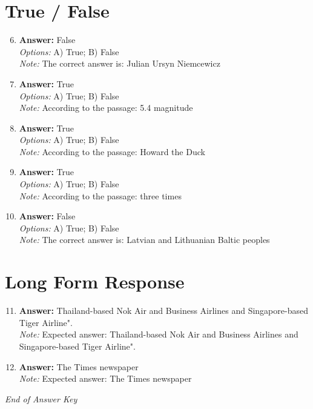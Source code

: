 \documentclass[12pt]{article}
\begin{document}
\section*{True / False}
\begin{enumerate}[label=\arabic*.]
\setcounter{enumi}{5}
\item \textbf{Answer:} False
\\ \textit{Options:} A) True; B) False
\\ \textit{Note:} The correct answer is: Julian Ursyn Niemcewicz
\item \textbf{Answer:} True
\\ \textit{Options:} A) True; B) False
\\ \textit{Note:} According to the passage: 5.4 magnitude
\item \textbf{Answer:} True
\\ \textit{Options:} A) True; B) False
\\ \textit{Note:} According to the passage: Howard the Duck
\item \textbf{Answer:} True
\\ \textit{Options:} A) True; B) False
\\ \textit{Note:} According to the passage: three times
\item \textbf{Answer:} False
\\ \textit{Options:} A) True; B) False
\\ \textit{Note:} The correct answer is: Latvian and Lithuanian Baltic peoples
\end{enumerate}

\section*{Long Form Response}
\begin{enumerate}[label=\arabic*.]
\setcounter{enumi}{10}
\item \textbf{Answer:} Thailand-based Nok Air and Business Airlines and Singapore-based Tiger Airline".
\\ \textit{Note:} Expected answer: Thailand-based Nok Air and Business Airlines and Singapore-based Tiger Airline".
\item \textbf{Answer:} The Times newspaper
\\ \textit{Note:} Expected answer: The Times newspaper
\end{enumerate}

\vfill
\noindent\textit{End of Answer Key}
\end{document}
